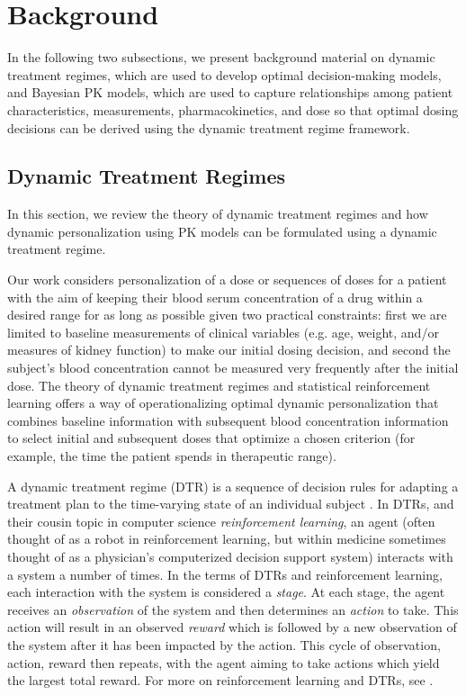 \section{Background}\label{ss:background}

In the following two subsections, we present background material on dynamic treatment regimes, which are used to develop optimal decision-making models, and Bayesian PK models, which are used to capture relationships among patient characteristics, measurements, pharmacokinetics, and dose so that optimal dosing decisions can be derived using the dynamic treatment regime framework.

\subsection{Dynamic Treatment Regimes}

In this section, we review the theory of dynamic treatment regimes and how dynamic personalization using PK models can be formulated using a dynamic treatment regime.

Our work considers personalization of a dose or sequences of doses for a patient with the aim of keeping their blood serum concentration of a drug within a desired range for as long as possible given two practical constraints: first we are limited to baseline measurements of clinical variables (e.g. age, weight, and/or measures of kidney function) to make our initial dosing decision, and second the subject’s blood concentration cannot be measured very frequently after the initial dose. The theory of dynamic treatment regimes and statistical reinforcement learning offers a way of operationalizing optimal dynamic personalization that combines baseline information with subsequent blood concentration information to select initial and subsequent doses that optimize a chosen criterion (for example, the time the patient spends in therapeutic range).

A dynamic treatment regime (DTR) is a sequence of decision rules for adapting a treatment plan to the time-varying state of an individual subject \cite{chakraborty2013statistical}. In DTRs, and their cousin topic in computer science \textit{reinforcement learning}, an agent (often thought of as a robot in reinforcement learning, but within medicine sometimes thought of as a physician’s computerized decision support system) interacts with a system a number of times. In the terms of DTRs and reinforcement learning, each interaction with the system is considered a \textit{stage}.  At each stage, the agent receives an \textit{observation} of the system and then determines an \textit{action} to take. This action will result in an observed \textit{reward} which is followed by a new observation of the system after it has been impacted by the action.  This cycle of observation, action, reward then repeats, with the agent aiming to take actions which yield the largest total reward. For more on reinforcement learning and DTRs, see \cite{lizotte17reinforcement, chakraborty2013statistical}.

